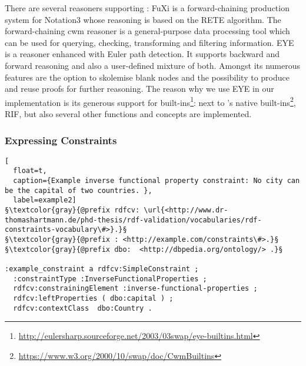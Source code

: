 There are several reasoners supporting \nthree:
FuXi \cite{fuxi} is a forward-chaining production system for Notation3 whose reasoning is based on the RETE algorithm. 
The forward-chaining cwm \cite{cwm} reasoner 
is a general-purpose data processing tool which can be used for querying, checking, transforming 
and filtering information.
EYE \cite{eyepaper} is a reasoner enhanced with Euler path detection. 
It supports 
backward and 
forward 
reasoning and also a user-defined mixture of both. 
Amongst its 
numerous features are the option to skolemise blank nodes
and  the possibility to produce and reuse proofs for further reasoning. 
The reason why we use EYE in our implementation is its generous support for built-ins\footnote{\url{http://eulersharp.sourceforge.net/2003/03swap/eye-builtins.html}}: 
next to \nthree's native built-ins\footnote{\url{https://www.w3.org/2000/10/swap/doc/CwmBuiltins}}, 
RIF, but also several other functions and concepts are implemented. 


\subsubsection{Expressing Constraints}


\begin{lstlisting}[
  float=t,
  caption={Example inverse functional property constraint: No city can be the capital of two countries. },
  label=example2]
§\textcolor{gray}{@prefix rdfcv: \url{<http://www.dr-thomashartmann.de/phd-thesis/rdf-validation/vocabularies/rdf-constraints-vocabulary\#>}.}§
§\textcolor{gray}{@prefix : <http://example.com/constraints\#>.}§
§\textcolor{gray}{@prefix dbo: 	<http://dbpedia.org/ontology/> .}§

:example_constraint a rdfcv:SimpleConstraint ;
  :constraintType :InverseFunctionalProperties ;
  rdfcv:constrainingElement :inverse-functional-properties ;
  rdfcv:leftProperties ( dbo:capital ) ;
  rdfcv:contextClass  dbo:Country .
\end{lstlisting}

